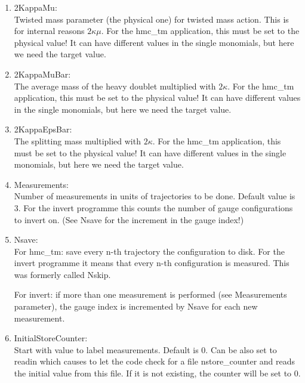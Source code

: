 \begin{enumerate}
\item {\ttfamily 2KappaMu}:\\
  Twisted mass parameter (the physical one) for twisted mass
  action. This is for internal reasons $2\kappa\mu$. For the {\ttfamily
    hmc\_tm} application, this must be set to the physical value! It
  can have different values in the single monomials, but here we need
  the target value.

\item {\ttfamily 2KappaMuBar}:\\
  The average mass of the heavy doublet multiplied with $2\kappa$. For
  the {\ttfamily hmc\_tm} application, this must be set to the physical value! It
  can have different values in the single monomials, but here we need
  the target value.

\item {\ttfamily 2KappaEpsBar}:\\
  The splitting mass multiplied with $2\kappa$. For the {\ttfamily
    hmc\_tm} application, this must be set to the physical value! It
  can have different values in the single monomials, but here we need
  the target value.

\item {\ttfamily Measurements}:\\
  Number of measurements in units of trajectories to be done. Default
  value is $3$. For the {\ttfamily invert} programme this counts the
  number of gauge configurations to invert on. (See {\ttfamily Nsave}
  for the increment in the gauge index!)

\item {\ttfamily Nsave}:\\
  For {\ttfamily hmc\_tm}: save every n-th trajectory the
  configuration to disk. 
  For the {\ttfamily invert} programme it means that every n-th
  configuration is measured. This was formerly called {\ttfamily
    Nskip}.
  
  For {\ttfamily invert}: if more than one measurement is performed
  (see {\ttfamily Measurements} parameter),
  the gauge index is incremented by {\ttfamily Nsave} for each new
  measurement. 

\item {\ttfamily InitialStoreCounter}:\\
  Start with value to label measurements. Default is $0$. Can be also
  set to {\ttfamily readin} which causes to let the code check for a
  file {\ttfamily nstore\_counter} and reads the initial value from
  this file. If it is not existing, the counter will be set to $0$.


\end{enumerate}
